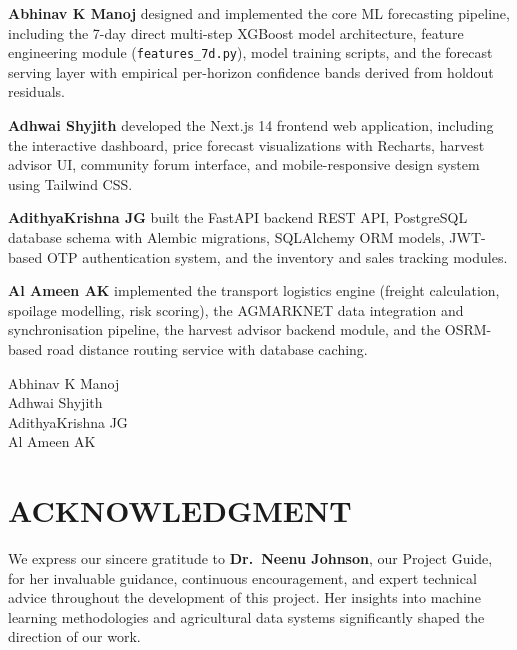 \documentclass[12pt,a4paper]{report}
\begin{document}
\vspace{3cm}

\noindent\textbf{Abhinav K Manoj} designed and implemented the core ML forecasting pipeline,
including the 7-day direct multi-step XGBoost model architecture, feature engineering module
(\texttt{features\_7d.py}), model training scripts, and the forecast serving layer with
empirical per-horizon confidence bands derived from holdout residuals.

\vspace{0.6cm}
\noindent\textbf{Adhwai Shyjith} developed the Next.js 14 frontend web application,
including the interactive dashboard, price forecast visualizations with Recharts,
harvest advisor UI, community forum interface, and mobile-responsive design system
using Tailwind CSS.

\vspace{0.6cm}
\noindent\textbf{AdithyaKrishna JG} built the FastAPI backend REST API, PostgreSQL
database schema with Alembic migrations, SQLAlchemy ORM models, JWT-based OTP
authentication system, and the inventory and sales tracking modules.

\vspace{0.6cm}
\noindent\textbf{Al Ameen AK} implemented the transport logistics engine (freight
calculation, spoilage modelling, risk scoring), the AGMARKNET data integration and
synchronisation pipeline, the harvest advisor backend module, and the OSRM-based
road distance routing service with database caching.

\vspace{4cm}

\begin{flushright}
Abhinav K Manoj\\
Adhwai Shyjith\\
AdithyaKrishna JG\\
Al Ameen AK
\end{flushright}

\newpage
\thispagestyle{empty}
\chapter*{ACKNOWLEDGMENT}

\vspace{2cm}

We express our sincere gratitude to \textbf{Dr.~Neenu Johnson}, our Project Guide, for
her invaluable guidance, continuous encouragement, and expert technical advice throughout
the development of this project. Her insights into machine learning methodologies and
agricultural data systems significantly shaped the direction of our work.
\end{document}
